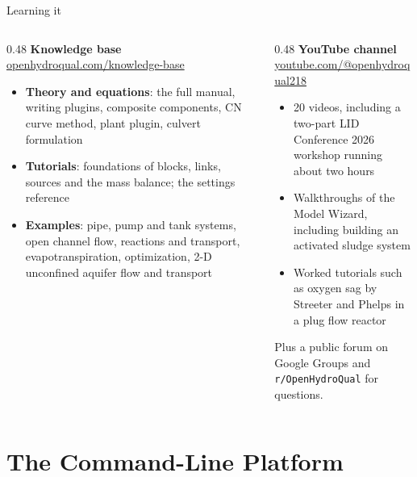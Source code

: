 \documentclass[aspectratio=169, 10pt]{beamer}
\begin{document}
\begin{frame}{Learning it}
  \begin{columns}[T,onlytextwidth]
    \begin{column}{0.48\textwidth}
      \textbf{\small Knowledge base}\\[2pt]
      {\scriptsize\url{openhydroqual.com/knowledge-base}}
      \begin{itemize}\setlength\itemsep{1pt}
        \item \textbf{Theory and equations}: the full manual, writing plugins,
              composite components, CN curve method, plant plugin, culvert
              formulation
        \item \textbf{Tutorials}: foundations of blocks, links, sources and the
              mass balance; the settings reference
        \item \textbf{Examples}: pipe, pump and tank systems, open channel
              flow, reactions and transport, evapotranspiration, optimization,
              2-D unconfined aquifer flow and transport
      \end{itemize}
    \end{column}
    \begin{column}{0.48\textwidth}
      \textbf{\small YouTube channel}\\[2pt]
      {\scriptsize\url{youtube.com/@openhydroqual218}}
      \begin{itemize}\setlength\itemsep{1pt}
        \item 20 videos, including a two-part \alert{LID Conference 2026
              workshop} running about two hours
        \item Walkthroughs of the Model Wizard, including building an
              activated sludge system
        \item Worked tutorials such as oxygen sag by Streeter and Phelps in a
              plug flow reactor
      \end{itemize}
      \vspace{0.5em}
      {\scriptsize Plus a public forum on Google Groups and
      \texttt{r/OpenHydroQual} for questions.}
    \end{column}
  \end{columns}
\end{frame}

\section{The Command-Line Platform}
\end{document}
